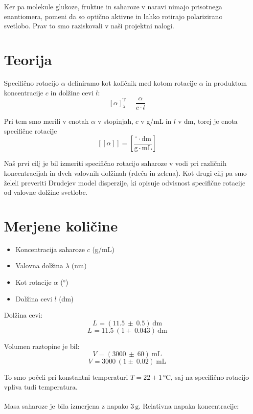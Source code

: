 \documentclass[a4paper,12pt]{article}
\newcommand{\abserr}[5]{
    \ensuremath{#1_{#2} = (#3 \ \pm \ #4) \ #5}
}
\newcommand{\relerr}[5]{
    \ensuremath{#1_{#2} = #3 \ (1 \pm \ #4) \ #5}
}
\begin{document}
Ker pa molekule glukoze, fruktue in saharoze v naravi nimajo prisotnega enantiomera, pomeni da so optično aktivne in lahko rotirajo polarizirano svetlobo. Prav to smo raziskovali v naši projektni nalogi.

\section*{Teorija}

Specifično rotacijo $\alpha$ definiramo kot količnik med kotom rotacije $\alpha$ in produktom koncentracije $c$ in dolžine cevi $l$:
\[
[\alpha]^{\text{T}}_{\lambda}= \frac{\alpha}{c \cdot l}
\]

Pri tem smo merili v enotah $\alpha$ v stopinjah, $c$ v g/mL in $l$ v dm, torej je enota specifične rotacije 
\[
\left[ [\alpha] \right] = \left[ \frac{^\circ \cdot \mathrm{dm}}{\mathrm{g} \cdot \mathrm{mL}} \right]
\]


Naš prvi cilj je bil izmeriti specifično rotacijo saharoze v vodi pri različnih koncentracijah in dveh valovnih dolžinah (rdeča in zelena).
Kot drugi cilj pa smo želeli preveriti Drudejev model disperzije, ki opisuje odvisnost specifične rotacije od valovne dolžine svetlobe.


\section*{Merjene količine}
\begin{itemize}
    \item Koncentracija saharoze $c$ (g/mL)
    \item Valovna dolžina $\lambda$ (nm)
    \item Kot rotacije $\alpha$ (°)
    \item Dolžina cevi $l$ (dm)
\end{itemize}


Dolžina cevi:
\[
\abserr{L}{}{11.5}{0.5}{\text{dm}}
\]
\[
\relerr{L}{}{11.5}{0.043}{\text{dm}}
\]

Volumen raztopine je bil:
\[
\abserr{V}{}{3000}{60}{\text{mL}}
\]
\[
\relerr{V}{}{3000}{0.02}{\text{mL}}
\]

To smo počeli pri konstantni temperaturi $T = 22 \pm 1 \, \text{°C}$, saj 
na specifično rotacijo vpliva tudi temperatura.\\\\

Masa saharoze je bila izmerjena z napako $3\,\text{g}$. Relativna napaka koncentracije:
\end{document}

